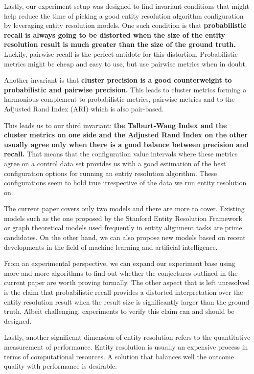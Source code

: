 \documentclass[journal]{IEEEtran}
\begin{document}
    Lastly, our experiment setup was designed to find invariant conditions that
    might help reduce the time of picking a good entity resolution algorithm
    configuration by leveraging entity resolution models.
    One such condition is that \textbf{probabilistic recall is always going to
    be distorted when the size of the entity resolution result is much greater
    than the size of the ground truth.}
    Luckily, pairwise recall is the perfect antidote for this distortion.
    Probabilistic metrics might be cheap and easy to use, but use pairwise
    metrics when in doubt.

    Another invariant is that \textbf{cluster precision is a good counterweight
    to probabilistic and pairwise precision.}
    This leads to cluster metrics forming a harmonious complement to
    probabilistic metrics, pairwise metrics and to the Adjusted Rand Index (ARI)
    which is also pair-based.
    
    This leads us to our third invariant: \textbf{the Talburt-Wang Index and the
    cluster metrics on one side and the Adjusted Rand Index on the other usually
    agree only when there is a good balance between precision and recall.}
    That means that the configuration value intervals where these metrics agree
    on a control data set provides us with a good estimation of the best
    configuration options for running an entity resolution algorithm.
    These configurations seem to hold true irrespective of the data we run
    entity resolution on.


    The current paper covers only two models and there are more to cover.
    Existing models such as the one proposed by the Stanford Entity Resolution
    Framework\cite{Ben2009Swoosh} or graph theoretical models used frequently in
    entity alignment tasks are prime candidates.
    On the other hand, we can also propose new models based on recent
    developments in the field of machine learning and artificial intelligence.

    From an experimental perspective, we can expand our experiment base using
    more and more algorithms to find out whether the conjectures outlined in
    the current paper are worth proving formally.
    The other aspect that is left unresolved is the claim that probabilistic
    recall provides a distorted interpretation over the entity resolution result
    when the result size is significantly larger than the ground truth.
    Albeit challenging, experiments to verify this claim can and should be
    designed.

    Lastly, another significant dimension of entity resolution refers to the
    quantitative measurement of performance.
    Entity resolution is usually an expensive process in terms of computational
    resources.
    A solution that balances well the outcome quality with performance is
    desirable.


    \balance

    
    
\end{document}
